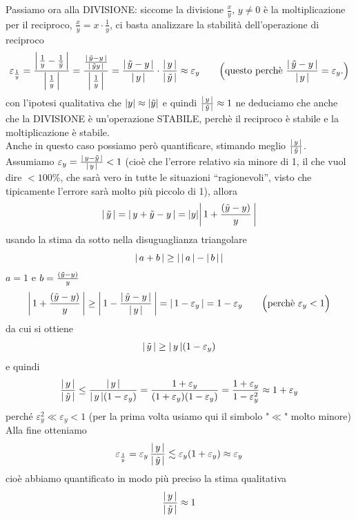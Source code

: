 \documentclass[12pt]{article}
\DeclarePairedDelimiter{\abs}{\lvert}{\rvert}
\begin{document}
Passiamo ora alla DIVISIONE: siccome la divisione $\frac{x}{y}, \, y \ne 0$ è la moltiplicazione per il reciproco, $\frac{x}{y} = x \cdot \frac{1}{y}$, ci basta analizzare la stabilità dell'operazione di reciproco
\[ \varepsilon_{\frac{1}{y}} = \frac{\abs*{\,\frac{1}{y} - \frac{1}{\Tilde{y}}\,} }{\abs*{\,\frac{1}{y}\,}} = \frac{\frac{\abs*{\,\Tilde{y} - y\,}}{\abs*{\,\Tilde{y}y\,}}}{\abs*{\,\frac{1}{y}\,}} = \frac{\abs*{\,\Tilde{y} - y\,}}{\abs*{\,y\,}} \cdot \frac{\abs*{\,y\,}}{\abs*{\,\Tilde{y}\,}} \approx \varepsilon_y \qquad \Bigl( \text{questo perchè } \frac{\abs*{\,\Tilde{y} - y\,}}{\abs*{\,y\,}} = \varepsilon_y . \Bigr)\]
con l’ipotesi qualitativa che $\abs{y} \approx \abs{\Tilde{y}}$ e quindi $\frac{\abs*{\,y\,}}{\abs*{\,\Tilde{y}\,}} \approx 1$ ne deduciamo che anche che la DIVISIONE è un’operazione STABILE, perchè il reciproco è stabile e la moltiplicazione è stabile.\\
Anche in questo caso possiamo però quantificare, stimando meglio $\frac{\abs*{\,y\,}}{\abs*{\,\Tilde{y}\,}}$.\\ 
Assumiamo $\varepsilon_y = \frac{\abs*{\,y - \Tilde{y}\,}}{\abs*{\,y\,}} < 1$ (cioè che l’errore relativo sia minore di 1, il che vuol dire $< 100\%$, che sarà vero in tutte le situazioni “ragionevoli”, visto che tipicamente l’errore sarà molto più piccolo di 1), allora 
\[ \abs{\,\Tilde{y}\,} = \abs{\,y + \Tilde{y} - y\,} = \abs{y}\abs*{\,1 + \frac{(\Tilde{y} - y)}{y}\,}\]
usando la stima da sotto nella disuguaglianza triangolare 
\[\abs{\, a + b\,} \ge \abs{\,\abs{\,a\,} - \abs{\,b\,}\,}\]
$a = 1$ e $b = \frac{(\Tilde{y} - y)}{y}$
\[\abs*{\,1 + \frac{(\Tilde{y} - y)}{y}\,} \ge \abs*{\,1 - \frac{\abs*{\,\Tilde{y} - y\,}}{\abs{\,y\,}}\,} = \abs*{\,1 - \varepsilon_y\,} = 1 - \varepsilon_y \qquad \Bigl( \text{perchè } \varepsilon_y < 1 \Bigr)\]
da cui si ottiene 
\[\abs{\,\Tilde{y}\,} \ge \abs{\,y\,}(1 - \varepsilon_y)\]
e quindi
\[\frac{\abs*{\,y\,}}{\abs*{\,\Tilde{y}\,}} \le \frac{\abs*{\,y\,}}{\abs{\,y\,}(1 - \varepsilon_y)} = \frac{1 + \varepsilon_y}{(1 + \varepsilon_y)(1 - \varepsilon_y)} = \frac{1 + \varepsilon_y}{1 - \varepsilon_y^2} \approx 1 + \varepsilon_y\]
perché $\varepsilon_y^2 \ll \varepsilon_y < 1$ (per la prima volta usiamo qui il simbolo "$\ll$" molto minore) \\
Alla fine otteniamo
\[\varepsilon_{\frac{1}{y}} = \varepsilon_y\,\frac{\abs{\,y\,}}{\abs{\,\Tilde{y}\,}} \lesssim \varepsilon_y (1 + \varepsilon_y) \approx \varepsilon_y\]
cioè abbiamo quantificato in modo più preciso la stima qualitativa 
\[\frac{\abs*{\,y\,}}{\abs*{\,\Tilde{y}\,}} \approx 1\]
\end{document}
